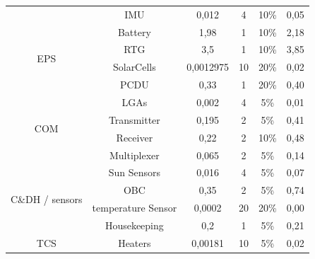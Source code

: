 \begin{table}[]
{\begin{tabular}{cccccc}
                                         & IMU                                 & 0,012                       & 4        & 10\%             & 0,05           \\
\multirow{4}{*}{EPS}                     & Battery                             & 1,98                        & 1        & 10\%             & 2,18           \\
                                         & RTG                                 & 3,5                         & 1        & 10\%             & 3,85           \\
                                         & SolarCells                          & 0,0012975                   & 10       & 20\%             & 0,02           \\
                                         & PCDU                                & 0,33                        & 1        & 20\%             & 0,40           \\
\multirow{4}{*}{COM}                     & LGAs                                & 0,002                       & 4        & 5\%              & 0,01           \\
                                         & Transmitter                         & 0,195                       & 2        & 5\%              & 0,41           \\
                                         & Receiver                            & 0,22                        & 2        & 10\%             & 0,48           \\
                                         & Multiplexer                         & 0,065                       & 2        & 5\%              & 0,14           \\
\multirow{4}{*}{C\&DH / sensors}         & Sun Sensors                         & 0,016                       & 4        & 5\%              & 0,07           \\
                                         & OBC                                 & 0,35                        & 2        & 5\%              & 0,74           \\
                                         & temperature Sensor                  & 0,0002                      & 20       & 20\%             & 0,00           \\
                                         & Housekeeping                        & 0,2                         & 1        & 5\%              & 0,21           \\
\multirow{5}{*}{TCS}                     & Heaters                             & 0,00181                     & 10       & 5\%              & 0,02           \\

\end{tabular}}
\end{table}
